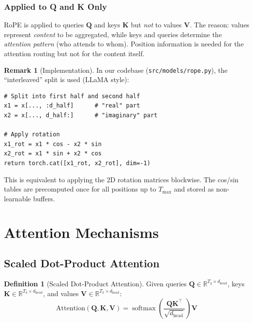 \documentclass[11pt, a4paper]{article}
\theoremstyle{definition}
\newtheorem{definition}{Definition}[section]
\newtheorem{remark}{Remark}[section]
\newcommand{\mQ}{\bm{Q}}
\newcommand{\mK}{\bm{K}}
\newcommand{\mV}{\bm{V}}
\newcommand{\reals}{\mathbb{R}}
\newcommand{\dhead}{d_{\text{head}}}
\DeclareMathOperator{\softmax}{softmax}
\begin{document}
\subsubsection{Applied to Q and K Only}

RoPE is applied to queries $\mQ$ and keys $\mK$ but \emph{not} to values $\mV$. The reason: values represent \emph{content} to be aggregated, while keys and queries determine the \emph{attention pattern} (who attends to whom). Position information is needed for the attention routing but not for the content itself.

\begin{remark}[Implementation]
In our codebase (\texttt{src/models/rope.py}), the ``interleaved'' split is used (LLaMA style):
\begin{lstlisting}
# Split into first half and second half
x1 = x[..., :d_half]      # "real" part
x2 = x[..., d_half:]      # "imaginary" part

# Apply rotation
x1_rot = x1 * cos - x2 * sin
x2_rot = x1 * sin + x2 * cos
return torch.cat([x1_rot, x2_rot], dim=-1)
\end{lstlisting}
This is equivalent to applying the 2D rotation matrices blockwise. The cos/sin tables are precomputed once for all positions up to $T_{\max}$ and stored as non-learnable buffers.
\end{remark}

\section{Attention Mechanisms}

\subsection{Scaled Dot-Product Attention}

\begin{definition}[Scaled Dot-Product Attention]
Given queries $\mQ \in \reals^{T_q \times \dhead}$, keys $\mK \in \reals^{T_k \times \dhead}$, and values $\mV \in \reals^{T_k \times \dhead}$:
\begin{equation}\label{eq:attention}
    \mathrm{Attention}(\mQ, \mK, \mV) = \softmax\left(\frac{\mQ \mK^\top}{\sqrt{\dhead}}\right) \mV
\end{equation}
\end{definition}
\end{document}

